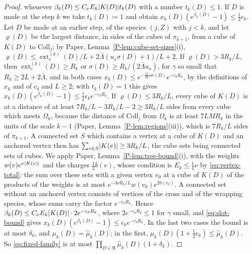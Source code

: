 \documentclass[11pt]{preprint}
\DeclarePairedDelimiter{\abs}{\lvert}{\rvert}
\numberwithin{equation}{section}
\theoremstyle{definition}
\theoremstyle{remark}
\theoremstyle{plain}
\begin{document}
\begin{proof}
whenever $\beta_k(D) \leq C_\nu E_k\abs{K(D)}t_k(D)$ with a number $t_k(D) \leq 1$. If $D$ is made at the step $k$ we take $t_k(D) \coloneqq 1$ and obtain $x_k(D)(e^{\beta_k(D)} - 1) \leq \frac12\epsilon_k$. Let $D$ be made at an earlier step, of the species $(j, Z)$ with $j < k$, and let $\varrho(D)$ be the largest distance, in sides of the cubes of $\pi_{k+1}$, from a cube of $K(D)$ to $\mathrm{Coll}_j$; by Paper, Lemma~\ref{P-lem:cube-set-sizes}(i), $\varrho(D) \leq \operatorname{ext}^{(k)}_{\mathrm c}(D)/L + 2\bar\Lambda(u_\star\sigma(D) + 1)/L + 2$. If $\varrho(D) > 3R_k/L$, then $\operatorname{ext}^{(k)}_{\mathrm c}(D) \geq R_k$ or $\sigma(D) \geq R_k/(2\bar\Lambda u_\star)$, for $\gamma$ so small that $R_k \geq 2L + 2\bar\Lambda$, and in both cases $x_k(D) \leq e^{-\frac{15}{32}\nu\sigma(D)}e^{-c_\delta R_k}$, by the definitions of $x_k$ and of $c_\delta$ and $L \geq 2$; with $t_k(D) = 1$ this gives $x_k(D)(e^{\beta_k(D)} - 1) \leq \frac12\epsilon_ke^{-c_\delta R_k}$. If $\varrho(D) \leq 3R_k/L$, every cube of $K(D)$ is at a distance of at least $7R_k/L - 3R_k/L - 2 \geq 3R_k/L$ sides from every cube which meets $\Omega_k$, because the distance of $\mathrm{Coll}_j$ from $\Omega_k$ is at least $7LMR_k$ in the units of the scale $k - 1$ (Paper, Lemma~\ref{P-lem:regions}(iii)), which is $7R_k/L$ sides of $\pi_{k+1}$. A connected set $S$ which contains a vertex at a cube of $K(D)$ and an anchored vertex then has $\sum_{v \in S}\abs{K(v)} \geq 3R_k/L$, the cube sets being connected sets of cubes. We apply Paper, Lemma~\ref{P-lem:tree-bound}(i), with the weights $w(v)e^{\nu\abs{K(v)}}$ and the charges $\frac12b(v)$, whose condition is $E_k \leq \frac14\nu$ by \eqref{eq:vertex-total}: the sum over these sets with a given vertex $v_0$ at a cube of $K(D)$ of the products of the weights is at most $e^{-3\nu R_k/L}w(v_0)e^{2b(v_0)}$. A connected set without an anchored vertex consists of vertices of the cross and of the wrapping species, whose sums carry the factor $e^{-c_\delta R_k}$. Hence $\beta_k(D) \leq C_\nu E_k\abs{K(D)}\cdot 2e^{-c_\delta R_k}$, where $2e^{-c_\delta R_k} \leq 1$ for $\gamma$ small, and \eqref{eq:slot-bound} gives $x_k(D)(e^{\beta_k(D)} - 1) \leq \epsilon_ke^{-c_\delta R_k}$. In the last two cases the bound is at most $\delta_k$, and $\mu_k(D) = \hat\mu_k(D)$; in the first, $\mu_k(D)(1 + \frac12\epsilon_k) \leq \hat\mu_k(D)$. So \eqref{eq:fixed-family} is at most $\prod_{D \in \mathfrak A}\hat\mu_k(D)(1 + \delta_k)$.


\end{proof}
\end{document}
